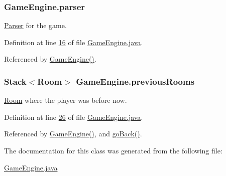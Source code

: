 \hypertarget{classGameEngine_a2e0d2b1fa2961a930e58e5e6102dc89b}{
\subsubsection[{parser}]{ Game\-Engine.\-parser\hspace{0.3cm}{\ttfamily [private]}}}\label{classGameEngine_a2e0d2b1fa2961a930e58e5e6102dc89b}
\hyperlink{classParser}{Parser} for the game. 

Definition at line \hyperlink{GameEngine_8java_source_l00016}{16} of file \hyperlink{GameEngine_8java_source}{Game\-Engine.\-java}.



Referenced by \hyperlink{GameEngine_8java_source_l00044}{Game\-Engine()}.

\hypertarget{classGameEngine_a46c905c0610d22223520a8db0e519ec1}{
\subsubsection[{previous\-Rooms}]{\setlength{\rightskip}{0pt plus 5cm}Stack$<${\bf Room}$>$ Game\-Engine.\-previous\-Rooms\hspace{0.3cm}{\ttfamily [private]}}}\label{classGameEngine_a46c905c0610d22223520a8db0e519ec1}
\hyperlink{classRoom}{Room} where the player was before now. 

Definition at line \hyperlink{GameEngine_8java_source_l00026}{26} of file \hyperlink{GameEngine_8java_source}{Game\-Engine.\-java}.



Referenced by \hyperlink{GameEngine_8java_source_l00044}{Game\-Engine()}, and \hyperlink{GameEngine_8java_source_l00252}{go\-Back()}.



The documentation for this class was generated from the following file\-:\begin{DoxyCompactItemize}
\item 
\hyperlink{GameEngine_8java}{Game\-Engine.\-java}\end{DoxyCompactItemize}
